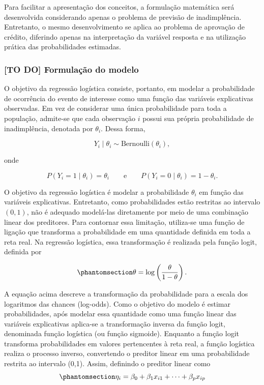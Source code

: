 \documentclass[
  brazilian,
  12pt,
  letterpaper,
  DIV=11,
  numbers=noendperiod]{scrartcl}
\begin{document}
Para facilitar a apresentação dos conceitos, a formulação matemática
será desenvolvida considerando apenas o problema de previsão de
inadimplência. Entretanto, o mesmo desenvolvimento se aplica ao problema
de aprovação de crédito, diferindo apenas na interpretação da variável
resposta e na utilização prática das probabilidades estimadas.

\subsubsection{{[}TO DO{]} Formulação do
modelo}\label{to-do-formulauxe7uxe3o-do-modelo}

O objetivo da regressão logística consiste, portanto, em modelar a
probabilidade de ocorrência do evento de interesse como uma função das
variáveis explicativas observadas. Em vez de considerar uma única
probabilidade para toda a população, admite-se que cada observação \(i\)
possui sua própria probabilidade de inadimplência, denotada por
\(\theta_i\). Dessa forma,

\begin{equation}
Y_i \mid \theta_i \sim \mathrm{Bernoulli}(\theta_i),
\label{eq:bernoulli_model}
\end{equation}

onde

\begin{equation}
P(Y_i = 1 \mid \theta_i) = \theta_i
\qquad \text{e} \qquad
P(Y_i = 0 \mid \theta_i) = 1 - \theta_i.
\label{eq:bernoulli_prob}
\end{equation}

O objetivo da regressão logística é modelar a probabilidade \(\theta_i\)
em função das variáveis explicativas. Entretanto, como probabilidades
estão restritas ao intervalo \((0,1)\), não é adequado modelá-las
diretamente por meio de uma combinação linear dos preditores. Para
contornar essa limitação, utiliza-se uma função de ligação que
transforma a probabilidade em uma quantidade definida em toda a reta
real. Na regressão logística, essa transformação é realizada pela função
logit, definida por

\begin{equation}\protect\phantomsection\label{eq-logit}{
\theta = \log\left(\frac{\theta}{1 - \theta}\right).
}\end{equation}

A equação acima descreve a transformação da probabilidade para a escala
dos logaritmos das chances (log-odds). Como o objetivo do modelo é
estimar probabilidades, após modelar essa quantidade como uma função
linear das variáveis explicativas aplica-se a transformação inversa da
função logit, denominada função logística (ou função sigmoide). Enquanto
a função logit transforma probabilidades em valores pertencentes à reta
real, a função logística realiza o processo inverso, convertendo o
preditor linear em uma probabilidade restrita ao intervalo (0,1). Assim,
definindo o preditor linear como
\begin{equation}\protect\phantomsection\label{eq-preditor-linear}{
\eta_i=\beta_0+\beta_1x_{i1}+\cdots+\beta_px_{ip}
}\end{equation}
\end{document}
